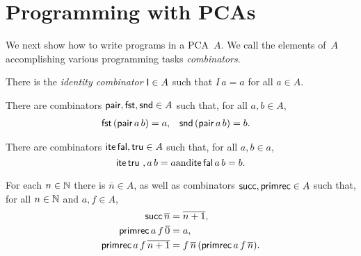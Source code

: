 \section{Programming with PCAs}

We next show how to write programs in a PCA~$A$.
We call the elements of~$A$ accomplishing various programming tasks \emph{combinators}.

\begin{definition}[Identity]
  \label{def:combinator-I}
  \leanok
  There is the \emph{identity combinator} $\mathsf{I} \in A$ such that $I \, a = a$ for all $a \in A$.
\end{definition}

\begin{definition}[Pairing]
  \label{def:combinator-pairing}
  \leanok
  There are combinators $\mathsf{pair}, \mathsf{fst}, \mathsf{snd} \in A$ such that, for all $a, b \in A$,
  \begin{align*}
    \mathsf{fst}\, (\mathsf{pair}\,a\,b) &= a,
    &
    \mathsf{snd}\, (\mathsf{pair}\,a\,b) &= b.
  \end{align*}
\end{definition}

\begin{definition}[Booleans]
  \label{def:combinator-bool}
  \leanok
  There are combinators $\mathsf{ite} \, \mathsf{fal}, \mathsf{tru} \in A$ such that, for all $a, b \in a$,
  \begin{equation*}
    \mathsf{ite} \, \mathsf{tru} \ ,a \, b = a
    \text{and}
    \mathsf{ite} \, \mathsf{fal} \, a \, b = b.
  \end{equation*}
\end{definition}

\begin{definition}[Numerals]
  \label{def:combinator-nat}
  \leanok
  For each $n \in \mathbb{N}$ there is $\overline{n} \in A$, as well as combinators $\mathsf{succ}, \mathsf{primrec} \in A$
  such that, for all $n \in \mathbb{N}$ and $a, f \in A$,
  \begin{align*}
    \mathsf{succ} \, \overline{n} &= \overline{n+1},
    \\
    \mathsf{primrec} \, a \, f \, \overline{0} &= a,
    \\
    \mathsf{primrec} \, a \, f \, \overline{n+1} &= f \, \overline{n} \, (\mathsf{primrec} \, a \, f \, \overline{n}).
  \end{align*}
\end{definition}

